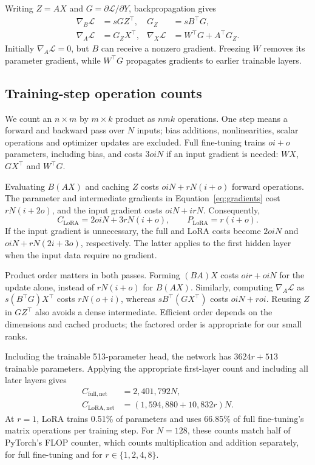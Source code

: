 \documentclass{article}
\begin{document}
Writing $Z=AX$ and $G=\partial\mathcal L/\partial Y$, backpropagation gives
\begin{align}
\nabla_B\mathcal L&=sGZ^\top,& G_Z&=sB^\top G,\nonumber\\
\nabla_A\mathcal L&=G_ZX^\top,&\nabla_X\mathcal L&=W^\top G+A^\top G_Z.
\label{eq:gradients}
\end{align}
Initially $\nabla_A\mathcal L=0$, but $B$ can receive a nonzero gradient. Freezing $W$ removes its parameter gradient, while $W^\top G$ propagates gradients to earlier trainable layers.

\subsection{Training-step operation counts}
We count an $n\times m$ by $m\times k$ product as $nmk$ operations. One step means a forward and backward pass over $N$ inputs; bias additions, nonlinearities, scalar operations and optimizer updates are excluded. Full fine-tuning trains $oi+o$ parameters, including bias, and costs $3oiN$ if an input gradient is needed: $WX$, $GX^\top$ and $W^\top G$.

Evaluating $B(AX)$ and caching $Z$ costs $oiN+rN(i+o)$ forward operations. The parameter and intermediate gradients in Equation~\ref{eq:gradients} cost $rN(i+2o)$, and the input gradient costs $oiN+irN$. Consequently,
\begin{equation}
C_{\mathrm{LoRA}}=2oiN+3rN(i+o),\qquad
P_{\mathrm{LoRA}}=r(i+o).
\label{eq:cost}
\end{equation}
If the input gradient is unnecessary, the full and LoRA costs become $2oiN$ and $oiN+rN(2i+3o)$, respectively. The latter applies to the first hidden layer when the input data require no gradient.

Product order matters in both passes. Forming $(BA)X$ costs $oir+oiN$ for the update alone, instead of $rN(i+o)$ for $B(AX)$. Similarly, computing $\nabla_A\mathcal L$ as $s(B^\top G)X^\top$ costs $rN(o+i)$, whereas $sB^\top(GX^\top)$ costs $oiN+roi$. Reusing $Z$ in $GZ^\top$ also avoids a dense intermediate. Efficient order depends on the dimensions and cached products; the factored order is appropriate for our small ranks.

Including the trainable 513-parameter head, the network has $3624r+513$ trainable parameters. Applying the appropriate first-layer count and including all later layers gives
\begin{align}
C_{\mathrm{full,net}}&=2{,}401{,}792N,\nonumber\\
C_{\mathrm{LoRA,net}}&=(1{,}594{,}880+10{,}832r)N.
\label{eq:networkcost}
\end{align}
At $r=1$, LoRA trains 0.51\% of parameters and uses 66.85\% of full fine-tuning's matrix operations per training step. For $N=128$, these counts match half of PyTorch's FLOP counter, which counts multiplication and addition separately, for full fine-tuning and for $r\in\{1,2,4,8\}$.
\end{document}
